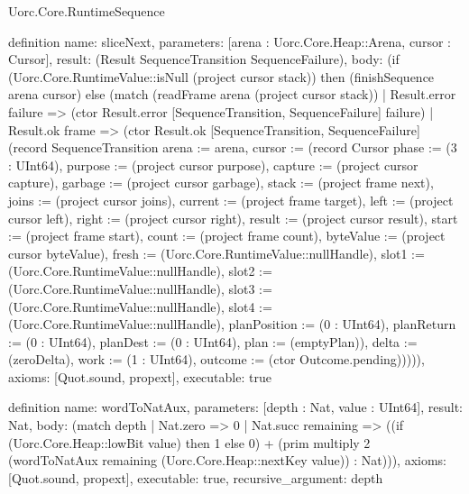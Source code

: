 \begin{lexlean}{Uorc.Core.RuntimeSequence}
\begin{semanticmodule}
definition{
  name: sliceNext,
  parameters: [arena : Uorc.Core.Heap::Arena, cursor : Cursor],
  result: (Result SequenceTransition SequenceFailure),
  body: (if (Uorc.Core.RuntimeValue::isNull (project cursor stack)) then (finishSequence arena cursor) else (match (readFrame arena (project cursor stack))
    | Result.error failure => (ctor Result.error [SequenceTransition, SequenceFailure] failure)
    | Result.ok frame => (ctor Result.ok [SequenceTransition, SequenceFailure] (record SequenceTransition {arena := arena, cursor := (record Cursor {phase := (3 : UInt64), purpose := (project cursor purpose), capture := (project cursor capture), garbage := (project cursor garbage), stack := (project frame next), joins := (project cursor joins), current := (project frame target), left := (project cursor left), right := (project cursor right), result := (project cursor result), start := (project frame start), count := (project frame count), byteValue := (project cursor byteValue), fresh := (Uorc.Core.RuntimeValue::nullHandle), slot1 := (Uorc.Core.RuntimeValue::nullHandle), slot2 := (Uorc.Core.RuntimeValue::nullHandle), slot3 := (Uorc.Core.RuntimeValue::nullHandle), slot4 := (Uorc.Core.RuntimeValue::nullHandle), planPosition := (0 : UInt64), planReturn := (0 : UInt64), planDest := (0 : UInt64), plan := (emptyPlan)}), delta := (zeroDelta), work := (1 : UInt64), outcome := (ctor Outcome.pending)})))),
  axioms: [Quot.sound, propext],
  executable: true
}

definition{
  name: wordToNatAux,
  parameters: [depth : Nat, value : UInt64],
  result: Nat,
  body: (match depth
    | Nat.zero => 0
    | Nat.succ remaining => ((if (Uorc.Core.Heap::lowBit value) then 1 else 0) + (prim multiply 2 (wordToNatAux remaining (Uorc.Core.Heap::nextKey value)) : Nat))),
  axioms: [Quot.sound, propext],
  executable: true,
  recursive_argument: depth
}


\end{semanticmodule}
\end{lexlean}

